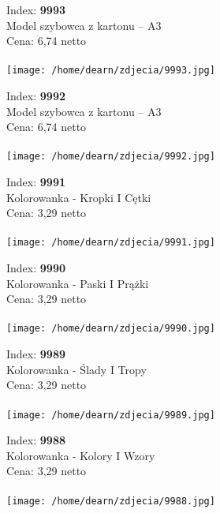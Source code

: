 {Index: \textbf{9993}\\
Model szybowca z kartonu – A3\\
Cena: 6,74 netto   \\\\  \texttt{[image: /home/dearn/zdjecia/9993.jpg]}}\newline\newline

{Index: \textbf{9992}\\
Model szybowca z kartonu – A3\\
Cena: 6,74 netto   \\\\  \texttt{[image: /home/dearn/zdjecia/9992.jpg]}}\newline\newline

{Index: \textbf{9991}\\
Kolorowanka - Kropki I Cętki \\
Cena: 3,29 netto   \\\\  \texttt{[image: /home/dearn/zdjecia/9991.jpg]}}\newline\newline

{Index: \textbf{9990}\\
Kolorowanka - Paski I Prążki \\
Cena: 3,29 netto   \\\\  \texttt{[image: /home/dearn/zdjecia/9990.jpg]}}\newline\newline

{Index: \textbf{9989}\\
Kolorowanka - Ślady I Tropy \\
Cena: 3,29 netto   \\\\  \texttt{[image: /home/dearn/zdjecia/9989.jpg]}}\newline\newline

{Index: \textbf{9988}\\
Kolorowanka - Kolory I Wzory \\
Cena: 3,29 netto   \\\\  \texttt{[image: /home/dearn/zdjecia/9988.jpg]}}\newline\newline

